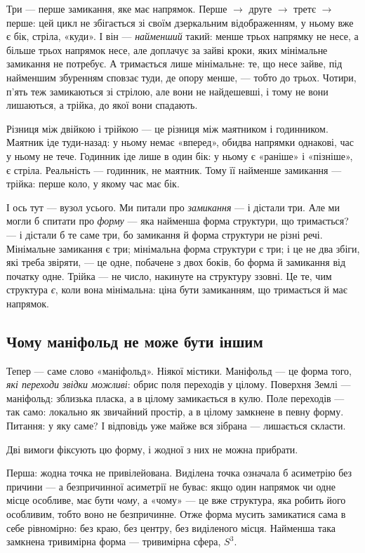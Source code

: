 \documentclass[12pt, a4paper, openany]{book}
\begin{document}
Три --- перше замикання, яке має напрямок. Перше $\to$ друге $\to$ третє $\to$ перше: цей цикл не збігається зі своїм дзеркальним відображенням, у ньому вже є бік, стріла, «куди». І він --- \emph{найменший} такий: менше трьох напрямку не несе, а більше трьох напрямок несе, але доплачує за зайві кроки, яких мінімальне замикання не потребує. А тримається лише мінімальне: те, що несе зайве, під найменшим збуренням сповзає туди, де опору менше, --- тобто до трьох. Чотири, п'ять теж замикаються зі стрілою, але вони не найдешевші, і тому не вони лишаються, а трійка, до якої вони спадають.

\begin{analogybox}
Різниця між двійкою і трійкою --- це різниця між маятником і годинником. Маятник іде туди-назад: у ньому немає «вперед», обидва напрямки однакові, час у ньому не тече. Годинник іде лише в один бік: у ньому є «раніше» і «пізніше», є стріла. Реальність --- годинник, не маятник. Тому її найменше замикання --- трійка: перше коло, у якому час має бік.
\end{analogybox}

І ось тут --- вузол усього. Ми питали про \emph{замикання} --- і дістали три. Але ми могли б спитати про \emph{форму} --- яка найменша форма структури, що тримається? --- і дістали б те саме три, бо замикання й форма структури не різні речі. Мінімальне замикання є три; мінімальна форма структури є три; і це не два збіги, які треба звіряти, --- це одне, побачене з двох боків, бо форма й замикання від початку одне. Трійка --- не число, накинуте на структуру ззовні. Це те, чим структура \emph{є}, коли вона мінімальна: ціна бути замиканням, що тримається й має напрямок.

\subsection{Чому маніфольд не може бути іншим}

Тепер --- саме слово «маніфольд». Ніякої містики. Маніфольд --- це форма того, \emph{які переходи звідки можливі}: обрис поля переходів у цілому. Поверхня Землі --- маніфольд: зблизька пласка, а в цілому замикається в кулю. Поле переходів --- так само: локально як звичайний простір, а в цілому замкнене в певну форму. Питання: у яку саме? І відповідь уже майже вся зібрана --- лишається скласти.

Дві вимоги фіксують цю форму, і жодної з них не можна прибрати.

Перша: жодна точка не привілейована. Виділена точка означала б асиметрію без причини --- а безпричинної асиметрії не буває: якщо один напрямок чи одне місце особливе, має бути \emph{чому}, а «чому» --- це вже структура, яка робить його особливим, тобто воно не безпричинне. Отже форма мусить замикатися сама в себе рівномірно: без краю, без центру, без виділеного місця. Найменша така замкнена тривимірна форма --- тривимірна сфера, $S^3$.
\end{document}
